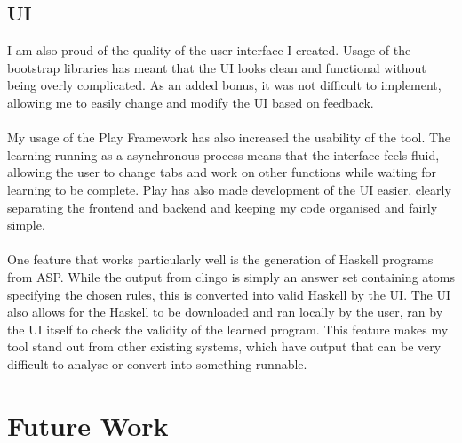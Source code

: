 \subsection{UI} 
I am also proud of the quality of the user interface I created. Usage of the bootstrap libraries has meant that the UI looks clean and functional without being overly complicated. As an added bonus, it was not difficult to implement, allowing me to easily change and modify the UI based on feedback. \\ \\
My usage of the Play Framework has also increased the usability of the tool. The learning running as a asynchronous process means that the interface feels fluid, allowing the user to change tabs and work on other functions while waiting for learning to be complete. Play has also made development of the UI easier, clearly separating the frontend and backend and keeping my code organised and fairly simple. \\ \\
One feature that works particularly well is the generation of Haskell programs from ASP. While the output from clingo is simply an answer set containing atoms specifying the chosen rules, this is converted into valid Haskell by the UI. The UI also allows for the Haskell to be downloaded and ran locally by the user, ran by the UI itself to check the validity of the learned program. This feature makes my tool stand out from other existing systems, which have output that can be very difficult to analyse or convert into something runnable.

\section{Future Work}

